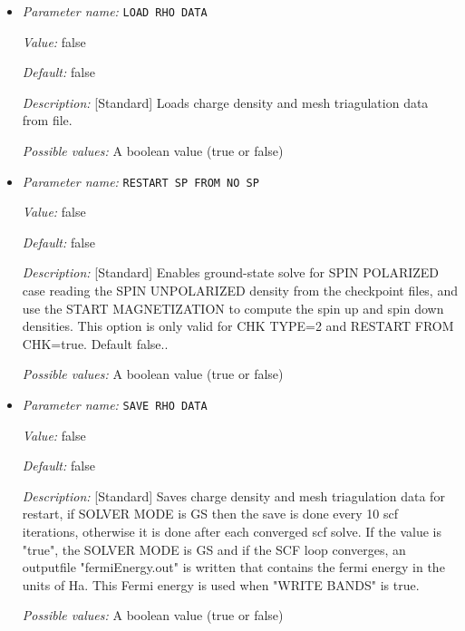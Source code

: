 \begin{itemize}
\item {\it Parameter name:} {\tt LOAD RHO DATA}
\label{parameters:SCF Checkpointing and Restart/LOAD RHO DATA}
\label{parameters:SCF_20Checkpointing_20and_20Restart/LOAD_20RHO_20DATA}


{\it Value:} false


{\it Default:} false


{\it Description:} [Standard] Loads charge density and mesh triagulation data from file.


{\it Possible values:} A boolean value (true or false)
\item {\it Parameter name:} {\tt RESTART SP FROM NO SP}
\label{parameters:SCF Checkpointing and Restart/RESTART SP FROM NO SP}
\label{parameters:SCF_20Checkpointing_20and_20Restart/RESTART_20SP_20FROM_20NO_20SP}


{\it Value:} false


{\it Default:} false


{\it Description:} [Standard] Enables ground-state solve for SPIN POLARIZED case reading the SPIN UNPOLARIZED density from the checkpoint files, and use the START MAGNETIZATION to compute the spin up and spin down densities. This option is only valid for CHK TYPE=2 and RESTART FROM CHK=true. Default false..


{\it Possible values:} A boolean value (true or false)
\item {\it Parameter name:} {\tt SAVE RHO DATA}
\label{parameters:SCF Checkpointing and Restart/SAVE RHO DATA}
\label{parameters:SCF_20Checkpointing_20and_20Restart/SAVE_20RHO_20DATA}


{\it Value:} false


{\it Default:} false


{\it Description:} [Standard] Saves charge density and mesh triagulation data for restart, if SOLVER MODE is GS then the save is done every 10 scf iterations, otherwise it is done after each converged scf solve. If the value is "true", the SOLVER MODE is GS and if the SCF loop converges, an outputfile "fermiEnergy.out" is written that contains the fermi energy in the units of Ha. This Fermi energy is used when "WRITE BANDS" is true.


{\it Possible values:} A boolean value (true or false)
\end{itemize}

